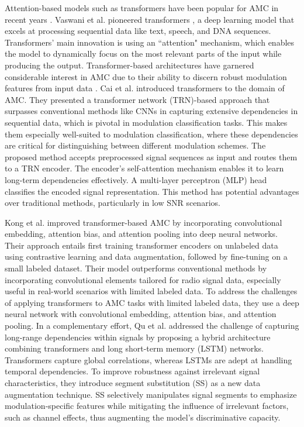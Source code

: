 Attention-based models such as transformers have been popular for AMC in recent years \cite{dao2023vt, hamidi2021mcformer, cai2022signal}. Vaswani et al. pioneered transformers \cite{vaswani2017attention}, a deep learning model that excels at processing sequential data like text, speech, and DNA sequences. Transformers' main innovation is using an ``attention" mechanism, which enables the model to dynamically focus on the most relevant parts of the input while producing the output. Transformer-based architectures have garnered considerable interest in AMC due to their ability to discern robust modulation features from input data \cite{cai2022signal, kong2023transformer, qu2024enhancing}. Cai et al. \cite{cai2022signal} introduced transformers to the domain of AMC. They presented a transformer network (TRN)-based approach that surpasses conventional methods like CNNs in capturing extensive dependencies in sequential data, which is pivotal in modulation classification tasks. This makes them especially well-suited to modulation classification, where these dependencies are critical for distinguishing between different modulation schemes. The proposed method accepts preprocessed signal sequences as input and routes them to a TRN encoder. The encoder's self-attention mechanism enables it to learn long-term dependencies effectively. A multi-layer perceptron (MLP) head classifies the encoded signal representation. This method has potential advantages over traditional methods, particularly in low SNR scenarios. 

Kong et al. \cite{kong2023transformer} improved transformer-based AMC by incorporating convolutional embedding, attention bias, and attention pooling into deep neural networks. Their approach entails first training transformer encoders on unlabeled data using contrastive learning and data augmentation, followed by fine-tuning on a small labeled dataset. Their model outperforms conventional methods by incorporating convolutional elements tailored for radio signal data, especially useful in real-world scenarios with limited labeled data. To address the challenges of applying transformers to AMC tasks with limited labeled data, they use a deep neural network with convolutional embedding, attention bias, and attention pooling. In a complementary effort, Qu et al. \cite{qu2024enhancing} addressed the challenge of capturing long-range dependencies within signals by proposing a hybrid architecture combining transformers and long short-term memory (LSTM) networks. Transformers capture global correlations, whereas LSTMs are adept at handling temporal dependencies. To improve robustness against irrelevant signal characteristics, they introduce segment substitution (SS) as a new data augmentation technique. SS selectively manipulates signal segments to emphasize modulation-specific features while mitigating the influence of irrelevant factors, such as channel effects, thus augmenting the model's discriminative capacity.


